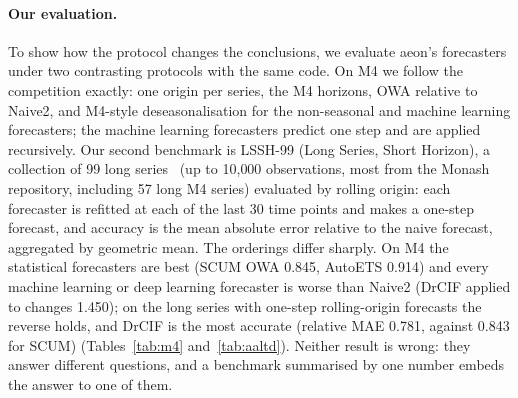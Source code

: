 \paragraph{Our evaluation.}
To show how the protocol changes the conclusions, we evaluate aeon's
forecasters under two contrasting protocols with the same code. On M4 we follow
the competition exactly: one origin per series, the M4 horizons, OWA relative
to Naive2, and M4-style deseasonalisation for the non-seasonal and machine
learning forecasters; the machine learning forecasters predict one step and are
applied recursively. Our second benchmark is LSSH-99 (Long Series, Short Horizon), a collection
of 99 long series~\citep{banwell26forecasting} (up to 10{,}000 observations, most from the Monash repository, including 57 long
M4 series) evaluated by rolling origin: each forecaster is refitted at each of
the last 30 time points and makes a one-step forecast, and accuracy is the mean
absolute error relative to the naive forecast, aggregated by geometric mean.
The orderings differ sharply. On M4 the statistical forecasters are best (SCUM
OWA 0.845, AutoETS 0.914) and every machine learning or deep learning forecaster
is worse than Naive2 (DrCIF applied to changes 1.450); on the long series with
one-step rolling-origin forecasts the reverse holds, and DrCIF is the most
accurate (relative MAE 0.781, against 0.843 for SCUM)
(Tables~\ref{tab:m4} and~\ref{tab:aaltd}). Neither result is wrong: they
answer different questions, and a benchmark summarised by one number embeds
the answer to one of them.
